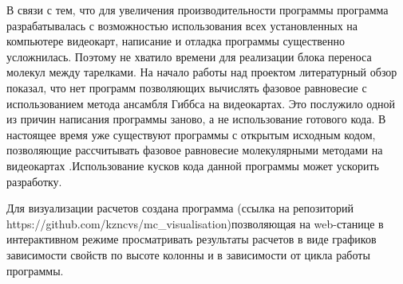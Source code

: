 В связи с тем, что для увеличения производительности программы программа разрабатывалась с возможностью использования всех установленных на компьютере видеокарт, написание и отладка программы существенно усложнилась. Поэтому не хватило времени для реализации блока переноса молекул между тарелками. На начало работы над проектом литературный обзор показал, что нет программ позволяющих вычислять фазовое равновесие с использованием метода ансамбля Гиббса на видеокартах. Это послужило одной из причин написания программы заново, а не использование готового кода. В настоящее время уже существуют программы с открытым исходным кодом, позволяющие рассчитывать фазовое равновесие молекулярными методами на видеокартах \cite{Nejahi2019}.Использование кусков кода данной программы может ускорить разработку. 


Для визуализации расчетов создана программа (ссылка на репозиторий \\ https://github.com/kzncvs/mc\_visualisation)позволяющая на web-станице в интерактивном режиме просматривать результаты расчетов в виде графиков зависимости свойств по высоте колонны и в зависимости от цикла работы программы. 